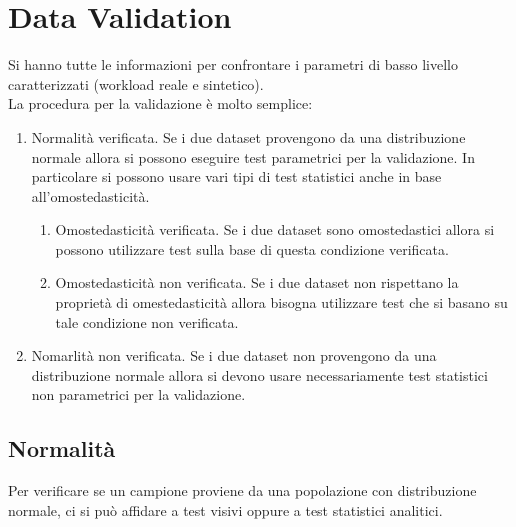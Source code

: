 \section{Data Validation}
Si hanno tutte le informazioni per confrontare i parametri di basso livello caratterizzati (workload reale e sintetico).
\\La procedura per la validazione è molto semplice:
\begin{enumerate}
	\item Normalità verificata. Se i due dataset provengono da una distribuzione normale allora si possono eseguire test parametrici per la validazione. In particolare si possono usare vari tipi di test statistici anche in base all'omostedasticità.
	\begin{enumerate}
		\item Omostedasticità verificata. Se i due dataset sono omostedastici allora si possono utilizzare test sulla base di questa condizione verificata.
		\item Omostedasticità non verificata. Se i due dataset non rispettano la proprietà di omestedasticità allora bisogna utilizzare test che si basano su tale condizione non verificata.
	\end{enumerate}
	\item Nomarlità non verificata. Se i due dataset non provengono da una distribuzione normale allora si devono usare necessariamente test statistici non parametrici per la validazione.
\end{enumerate}

\subsection{Normalità}
Per verificare se un campione proviene da una popolazione con distribuzione normale, ci si può affidare a test visivi oppure a test statistici analitici.
